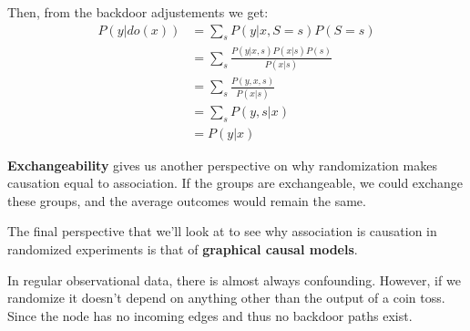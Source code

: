 Then, from the backdoor adjustements we get:
\begin{equation}
    \begin{array}{ll}
        P(y|do(x)) & = \sum_s P(y|x, S = s)P(S = s)  \\
            & = \sum_s \frac{P(y|x, s)P(x|s)P(s)}{P(x | s)} \\
            & = \sum_s \frac{P(y, x, s)}{P(x | s)} \\
            & = \sum_s P(y, s| x) \\
            & = P(y | x)
    \end{array}
\end{equation}

\textbf{Exchangeability} gives us another perspective on why randomization makes causation equal to association. If the groups are exchangeable, we could exchange these groups, and the average outcomes would remain the same.

The final perspective that we'll look at to see why association is causation in randomized experiments is that of \textbf{graphical causal models}.

In regular observational data, there is almost always confounding. However, if we randomize  it doesn't depend on anything other than the output of a coin toss. Since the node has no incoming edges and thus no backdoor paths exist.